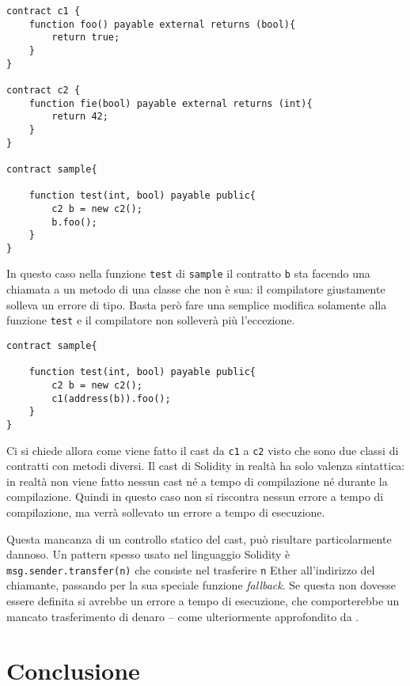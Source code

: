\documentclass[12pt,a4paper]{report}
\begin{document}
\begin{verbatim}
contract c1 {
    function foo() payable external returns (bool){
        return true;
    }
}

contract c2 {
    function fie(bool) payable external returns (int){
        return 42;
    }
}

contract sample{

    function test(int, bool) payable public{
        c2 b = new c2();
        b.foo();
    }
}
\end{verbatim}

In questo caso nella funzione \texttt{test} di \texttt{sample} il
contratto \texttt{b} sta facendo una chiamata a un metodo di una classe
che non è sua: il compilatore giustamente solleva un errore di tipo.
Basta però fare una semplice modifica solamente alla funzione
\texttt{test} e il compilatore non solleverà più l'eccezione.

\begin{verbatim}
contract sample{

    function test(int, bool) payable public{
        c2 b = new c2();
        c1(address(b)).foo();
    }
}
\end{verbatim}

Ci si chiede allora come viene fatto il cast da \texttt{c1} a
\texttt{c2} visto che sono due classi di contratti con metodi diversi.
Il cast di Solidity in realtà ha solo valenza sintattica: in realtà non
viene fatto nessun cast né a tempo di compilazione né durante la
compilazione. Quindi in questo caso non si riscontra nessun errore a
tempo di compilazione, ma verrà sollevato un errore a tempo di
esecuzione.

Questa mancanza di un controllo statico del cast, può risultare
particolarmente dannoso. Un pattern spesso usato nel linguaggio Solidity
è \texttt{msg.sender.transfer(n)} che consiste nel trasferire \texttt{n}
Ether all'indirizzo del chiamante, passando per la sua speciale funzione
\emph{fallback}. Se questa non dovesse essere definita si avrebbe un
errore a tempo di esecuzione, che comporterebbe un mancato trasferimento
di denaro -- come ulteriormente approfondito da .

\hypertarget{conclusione-3}{%
\section{Conclusione}\label{conclusione-3}}
\end{document}
